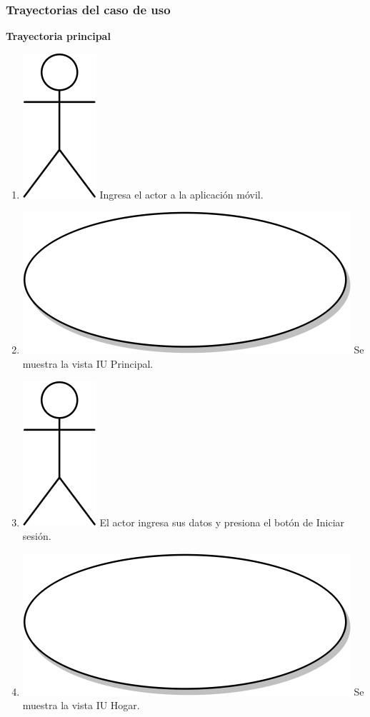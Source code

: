 \subsubsection{Trayectorias del caso de uso}
\textbf{Trayectoria principal}
\begin{enumerate}
 \item {\includegraphics[scale=.1]{Capitulo3/img/actor.png} Ingresa el actor a la aplicación móvil.}
\item {\includegraphics[scale=.05]{Capitulo3/img/proceso.png} Se muestra la vista IU Principal.}
\item {\includegraphics[scale=.1]{Capitulo3/img/actor.png} El actor ingresa sus datos y presiona el botón de Iniciar sesión.}
\item {\includegraphics[scale=.05]{Capitulo3/img/proceso.png} Se muestra la vista IU Hogar.}

\end{enumerate}
